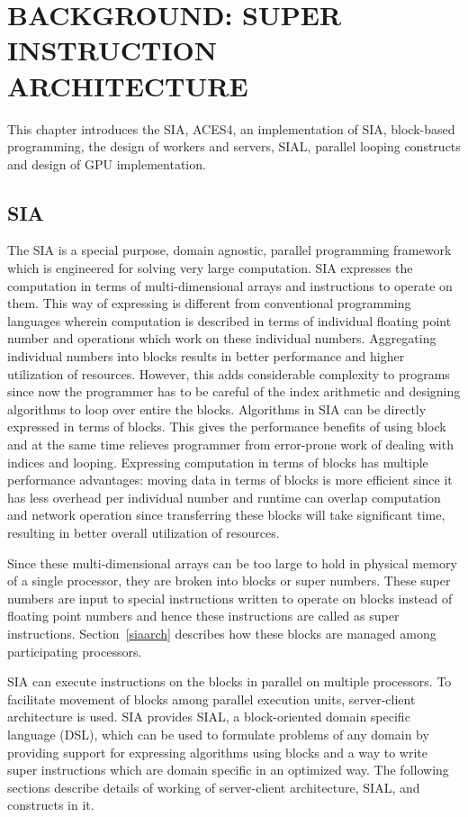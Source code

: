 \chapter{BACKGROUND: SUPER INSTRUCTION ARCHITECTURE} \label{background}

This chapter introduces the SIA, ACES4, an implementation of SIA, block-based
programming, the design of workers and servers, SIAL, parallel looping constructs
and design of GPU implementation.

\section{SIA}
The SIA is a special purpose, domain agnostic,
parallel programming framework which is engineered for solving very large
computation. SIA expresses the computation in terms of multi-dimensional arrays and
instructions to operate on them. This way of expressing is different from conventional programming
languages wherein computation is described in terms of individual floating point
number and operations which work on these individual numbers. Aggregating
individual numbers into blocks results in better performance and higher utilization
of resources. However, this adds considerable complexity to programs since now
the programmer has to be careful of the index arithmetic and designing algorithms to loop
over entire the blocks. Algorithms in SIA can be directly expressed in terms of
blocks. This gives the performance benefits of using block and at the same time relieves
programmer from error-prone work of dealing with indices and looping. Expressing
computation in terms of blocks has multiple performance advantages: moving data in terms
of blocks is more efficient since it has less overhead per individual number
and runtime can overlap computation and network operation since transferring these
blocks will take significant time, resulting in better overall utilization of resources.

Since these multi-dimensional arrays can be too
large to hold in physical memory of a single processor, they are broken into
blocks or super numbers. These super numbers are input to special instructions
written to operate on blocks instead of floating point numbers and hence these
instructions are called as super instructions. Section~\ref{siaarch} describes how
these blocks are managed among participating processors.

SIA can execute instructions on the blocks in parallel on multiple processors. To
facilitate movement of blocks among parallel execution units, server-client
architecture is used. SIA provides SIAL, a block-oriented domain specific
language (DSL), which can be used to formulate problems of any domain by providing
support for expressing algorithms using blocks and a way
to write super instructions which are domain specific in an optimized way. The
following sections describe details of working of server-client architecture,
SIAL, and constructs in it.

